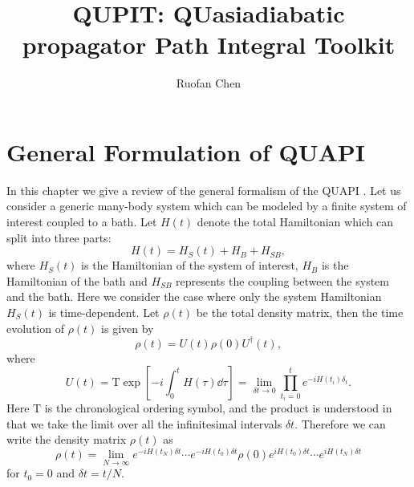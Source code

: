\documentclass[11pt]{book}
\date{}
\title{}
\begin{document}
\title{QUPIT: QUasiadiabatic propagator Path Integral Toolkit}
\author{Ruofan Chen}
\maketitle
\tableofcontents

\chapter{General Formulation of QUAPI}
\label{sec:org611f55b}
In this chapter we give a review of the general formalism of the QUAPI
\cite{makarov1994-path,makri1995-numerical,segal2010-numerically}.  Let
us consider a generic many-body system which can be modeled by a
finite system of interest coupled to a bath. Let \(H(t)\) denote the
total Hamiltonian which can split into three parts:
\begin{equation}
H(t)=H_S(t)+H_B+H_{SB},
\end{equation}
where \(H_S(t)\) is the Hamiltonian of the system of interest, \(H_B\) is
the Hamiltonian of the bath and \(H_{SB}\) represents the coupling
between the system and the bath. Here we consider the case where only
the system Hamiltonian \(H_S(t)\) is time-dependent. Let \(\rho(t)\) be
the total density matrix, then the time evolution of \(\rho(t)\) is
given by
\begin{equation}
\rho(t)=U(t)\rho(0)U^{\dag}(t),
\end{equation}
where
\begin{equation}
U(t)=\mathrm{T}\exp[-i\int_0^t H(\tau)\dd{\tau}]
=\lim_{\delta t\to0}\prod_{t_i=0}^t e^{-iH(t_i)\delta_t}.
\end{equation}
Here \(\mathrm{T}\) is the chronological ordering symbol, and the
product is understood in that we take the limit over all the
infinitesimal intervals \(\delta t\). Therefore we can write the density
matrix \(\rho(t)\) as
\begin{equation}
\rho(t)=\lim_{N\to\infty}e^{-iH(t_N)\delta t}\cdots e^{-iH(t_0)\delta t}
\rho(0)e^{iH(t_0)\delta t}\cdots e^{iH(t_N)\delta t}
\end{equation}
for \(t_0=0\) and \(\delta t=t/N\).
\end{document}
